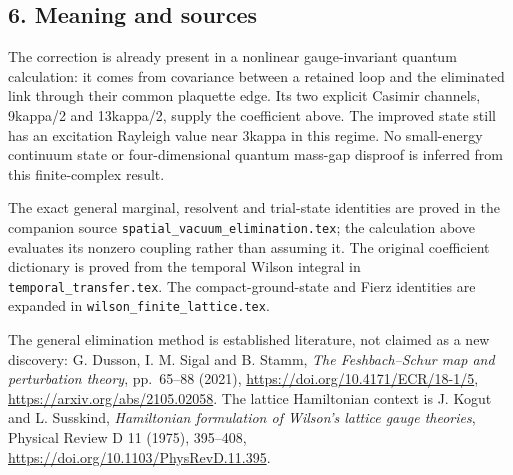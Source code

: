 \documentclass[
  11pt,
]{article}
\begin{document}
\subsection{6. Meaning and sources}\label{meaning-and-sources}

The correction is already present in a nonlinear gauge-invariant quantum
calculation: it comes from covariance between a retained loop and the
eliminated link through their common plaquette edge. Its two explicit
Casimir channels, 9kappa/2 and 13kappa/2, supply the coefficient above.
The improved state still has an excitation Rayleigh value near 3kappa in
this regime. No small-energy continuum state or four-dimensional quantum
mass-gap disproof is inferred from this finite-complex result.

The exact general marginal, resolvent and trial-state identities are
proved in the companion source
\texttt{spatial\_vacuum\_elimination.tex}; the calculation above
evaluates its nonzero coupling rather than assuming it. The original
coefficient dictionary is proved from the temporal Wilson integral in
\texttt{temporal\_transfer.tex}. The compact-ground-state and Fierz
identities are expanded in \texttt{wilson\_finite\_lattice.tex}.

The general elimination method is established literature, not claimed as
a new discovery: G. Dusson, I. M. Sigal and B. Stamm, \emph{The
Feshbach--Schur map and perturbation theory}, pp.~65--88 (2021),
\url{https://doi.org/10.4171/ECR/18-1/5},
\url{https://arxiv.org/abs/2105.02058}. The lattice Hamiltonian context
is J. Kogut and L. Susskind, \emph{Hamiltonian formulation of Wilson's
lattice gauge theories}, Physical Review D 11 (1975), 395--408,
\url{https://doi.org/10.1103/PhysRevD.11.395}.
\end{document}
